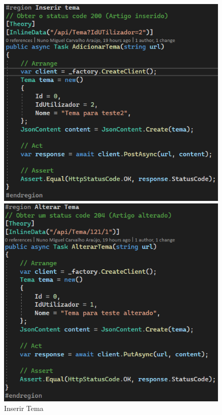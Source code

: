 \begin{figure}[!htbp]
  \centering
  \begin{minipage}[b]{0.4\textwidth}
    \includegraphics[width=\textwidth]{Figuras/TestesUnitarios/Tema/Inserir Tema.png}
    \caption{Inserir Tema}
    \label{d.unitario}
  \end{minipage}
  \hfill
  \begin{minipage}[b]{0.4\textwidth}
    \includegraphics[width=\textwidth]{Figuras/TestesUnitarios/Tema/Alterar Tema.png}

\end{minipage}
\end{figure}

